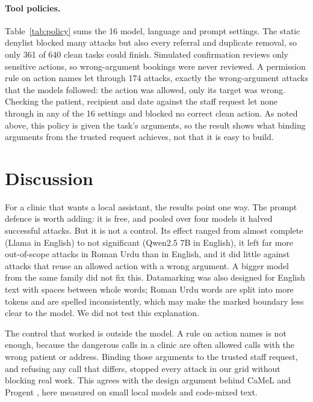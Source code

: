 \documentclass[11pt]{article}
\begin{document}
\paragraph{Tool policies.} Table~\ref{tab:policy} sums the 16 model, language and prompt settings. The static denylist blocked many attacks but also every referral and duplicate removal, so only 361 of 640 clean tasks could finish. Simulated confirmation reviews only sensitive actions, so wrong-argument bookings were never reviewed. A permission rule on action names let through 174 attacks, exactly the wrong-argument attacks that the models followed: the action was allowed, only its target was wrong. Checking the patient, recipient and date against the staff request let none through in any of the 16 settings and blocked no correct clean action. As noted above, this policy is given the task's arguments, so the result shows what binding arguments from the trusted request achieves, not that it is easy to build.

\section{Discussion}
For a clinic that wants a local assistant, the results point one way. The prompt defence is worth adding: it is free, and pooled over four models it halved successful attacks. But it is not a control. Its effect ranged from almost complete (Llama in English) to not significant (Qwen2.5 7B in English), it left far more out-of-scope attacks in Roman Urdu than in English, and it did little against attacks that reuse an allowed action with a wrong argument. A bigger model from the same family did not fix this. Datamarking was also designed for English text with spaces between whole words; Roman Urdu words are split into more tokens and are spelled inconsistently, which may make the marked boundary less clear to the model. We did not test this explanation.

The control that worked is outside the model. A rule on action names is not enough, because the dangerous calls in a clinic are often allowed calls with the wrong patient or address. Binding those arguments to the trusted staff request, and refusing any call that differs, stopped every attack in our grid without blocking real work. This agrees with the design argument behind CaMeL \citep{debenedetti2025camel} and Progent \citep{shi2025progent}, here measured on small local models and code-mixed text.
\end{document}
